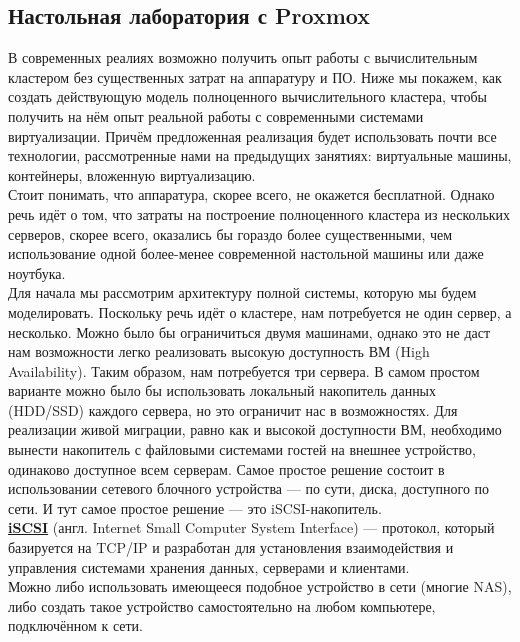 \documentclass[14pt, a4paper]{article}
\begin{document}
\subsection*{Настольная лаборатория с Proxmox} 

В современных реалиях возможно получить опыт работы с вычислительным кластером без
существенных затрат на аппаратуру и ПО. Ниже мы покажем, как создать действующую модель
полноценного вычислительного кластера, чтобы получить на нём опыт реальной работы с
современными системами виртуализации. Причём предложенная реализация будет использовать
почти все технологии, рассмотренные нами на предыдущих занятиях: виртуальные машины,
контейнеры, вложенную виртуализацию.\\

Стоит понимать, что аппаратура, скорее всего, не окажется бесплатной. Однако речь идёт о том, что
затраты на построение полноценного кластера из нескольких серверов, скорее всего, оказались бы
гораздо более существенными, чем использование одной более-менее современной настольной
машины или даже ноутбука.\\

Для начала мы рассмотрим архитектуру полной системы, которую мы будем моделировать. Поскольку
речь идёт о кластере, нам потребуется не один сервер, а несколько. Можно было бы ограничиться
двумя машинами, однако это не даст нам возможности легко реализовать высокую доступность ВМ
(High Availability). Таким образом, нам потребуется три сервера. В самом простом варианте можно
было бы использовать локальный накопитель данных (HDD/SSD) каждого сервера, но это ограничит
нас в возможностях. Для реализации живой миграции, равно как и высокой доступности ВМ,
необходимо вынести накопитель с файловыми системами гостей на внешнее устройство, одинаково
доступное всем серверам. Самое простое решение состоит в использовании сетевого блочного
устройства — по сути, диска, доступного по сети. И тут самое простое решение — это
iSCSI-накопитель.\\

\href{https://ru.wikipedia.org/wiki/ISCSI}{\textbf{iSCSI}} (англ. Internet Small Computer System Interface) — протокол, который базируется на TCP/IP и
разработан для установления взаимодействия и управления системами хранения данных, серверами
и клиентами.\\

Можно либо использовать имеющееся подобное устройство в сети (многие NAS), либо создать такое
устройство самостоятельно на любом компьютере, подключённом к сети.\\
\end{document}
